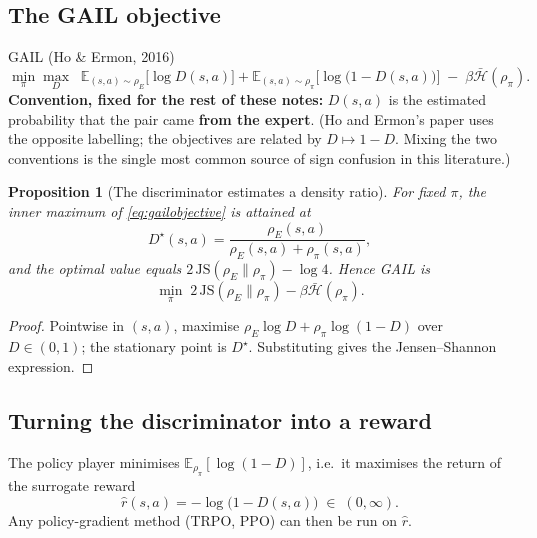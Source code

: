 \documentclass[11pt]{article}
\theoremstyle{plain}
\newtheorem{proposition}[theorem]{Proposition}
\theoremstyle{definition}
\theoremstyle{remark}
\newcommand{\E}{\mathbb{E}}
\newcommand{\JS}{\mathrm{JS}}
\begin{document}
\subsection{The GAIL objective}

\begin{graybox}{GAIL (Ho \& Ermon, 2016)}
\begin{equation}
\min_\pi \max_D \;\; \E_{(s,a)\sim\rho_E}\big[\log D(s,a)\big] +
\E_{(s,a)\sim\rho_\pi}\big[\log\big(1-D(s,a)\big)\big] \;-\;
\beta\bar{\mathcal{H}}(\rho_\pi).
\label{eq:gailobjective}
\end{equation}
\textbf{Convention, fixed for the rest of these notes:} $D(s,a)$ is the
estimated probability that the pair came \textbf{from the expert}. (Ho and
Ermon's paper uses the opposite labelling; the objectives are related by
$D\mapsto1-D$. Mixing the two conventions is the single most common source
of sign confusion in this literature.)
\end{graybox}

\begin{proposition}[The discriminator estimates a density
ratio]\label{prop:gaildratio}
For fixed $\pi$, the inner maximum of \eqref{eq:gailobjective} is attained
at
\begin{equation}
D^\star(s,a) = \frac{\rho_E(s,a)}{\rho_E(s,a)+\rho_\pi(s,a)},
\label{eq:gaildstar}
\end{equation}
and the optimal value equals $2\,\JS(\rho_E\|\rho_\pi) - \log4$. Hence
GAIL is
\begin{equation}
\min_\pi \; 2\,\JS(\rho_E\|\rho_\pi) - \beta\bar{\mathcal{H}}(\rho_\pi).
\label{eq:gailjs}
\end{equation}
\end{proposition}

\begin{proof}
Pointwise in $(s,a)$, maximise $\rho_E\log D + \rho_\pi\log(1-D)$ over
$D\in(0,1)$; the stationary point is $D^\star$. Substituting gives the
Jensen--Shannon expression.
\end{proof}

\subsection{Turning the discriminator into a reward}

The policy player minimises $\E_{\rho_\pi}[\log(1-D)]$, i.e.\ it maximises
the return of the surrogate reward
\begin{equation}
\hat r(s,a) = -\log\big(1-D(s,a)\big) \;\in\; (0,\infty).
\label{eq:gailreward}
\end{equation}
Any policy-gradient method (TRPO, PPO) can then be run on $\hat r$.
\end{document}
